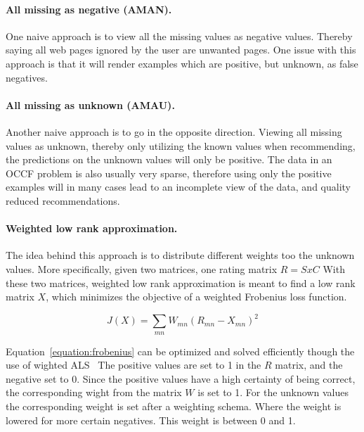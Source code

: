 \paragraph{All missing as negative (AMAN).}
One naive approach is to view all the missing values as negative values.
Thereby saying all web pages ignored by the user are unwanted pages.
One issue with this approach is that it will render examples which are positive, but unknown, as false negatives.

\paragraph{All missing as unknown (AMAU).}
Another naive approach is to go in the opposite direction.
Viewing all missing values as unknown, thereby only utilizing the known values when recommending, the predictions on the unknown values will only be positive.
The data in an OCCF problem is also usually very sparse, therefore using only the positive examples will in many cases lead to an incomplete view of the data, and quality reduced recommendations.

\paragraph{Weighted low rank approximation.} %
The idea behind this approach is to distribute different weights too the unknown values.
More specifically, given two matrices, one rating matrix $R = SxC$ %
With these two matrices, weighted low rank approximation is meant to find a low rank matrix $X$, which minimizes the objective of a weighted Frobenius loss function. %

\begin{equation}
J(X) = \sum_{mn} W_{mn}(R_{mn} - X_{mn})^2
\label{equation:frobenius}
\end{equation}

Equation~\ref{equation:frobenius} can be optimized and solved efficiently though the use of wighted ALS~%
The positive values are set to 1 in the $R$ matrix, and the negative set to 0.
Since the positive values have a high certainty of being correct, the corresponding wight from the matrix $W$ is set to 1.
For the unknown values the corresponding weight is set after a weighting schema.
Where the weight is lowered for more certain negatives.
This weight is between 0 and 1.


